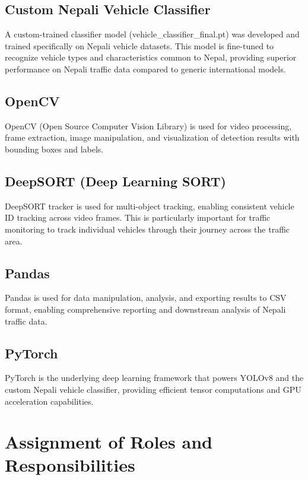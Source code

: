 \documentclass[12pt,a4paper]{report}
\begin{document}
\subsection{Custom Nepali Vehicle Classifier}
A custom-trained classifier model (vehicle\_classifier\_final.pt) was developed and trained specifically on Nepali vehicle datasets. This model is fine-tuned to recognize vehicle types and characteristics common to Nepal, providing superior performance on Nepali traffic data compared to generic international models.

\subsection{OpenCV}
OpenCV \cite{opencv2000the} (Open Source Computer Vision Library) is used for video processing, frame extraction, image manipulation, and visualization of detection results with bounding boxes and labels.

\subsection{DeepSORT (Deep Learning SORT)}
DeepSORT tracker \cite{bewley2016deepsort} is used for multi-object tracking, enabling consistent vehicle ID tracking across video frames. This is particularly important for traffic monitoring to track individual vehicles through their journey across the traffic area.

\subsection{Pandas}
Pandas \cite{mckinney2010data} is used for data manipulation, analysis, and exporting results to CSV format, enabling comprehensive reporting and downstream analysis of Nepali traffic data.

\subsection{PyTorch}
PyTorch \cite{pytorch2019automatic} is the underlying deep learning framework that powers YOLOv8 and the custom Nepali vehicle classifier, providing efficient tensor computations and GPU acceleration capabilities.

\section{Assignment of Roles and Responsibilities}
\end{document}
